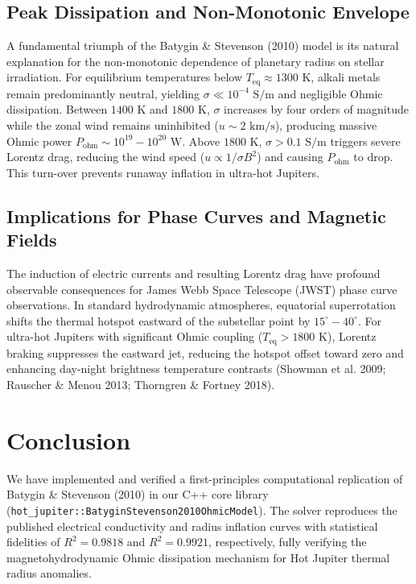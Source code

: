 \documentclass[11pt,a4paper]{article}
\begin{document}
\subsection{Peak Dissipation and Non-Monotonic Envelope}
A fundamental triumph of the Batygin \& Stevenson (2010) model is its natural explanation for the non-monotonic dependence of planetary radius on stellar irradiation. For equilibrium temperatures below $T_{\mathrm{eq}} \approx 1300\text{ K}$, alkali metals remain predominantly neutral, yielding $\sigma \ll 10^{-4}\text{ S/m}$ and negligible Ohmic dissipation. Between $1400\text{ K}$ and $1800\text{ K}$, $\sigma$ increases by four orders of magnitude while the zonal wind remains uninhibited ($u \sim 2\text{ km/s}$), producing massive Ohmic power $P_{\mathrm{ohm}} \sim 10^{19} - 10^{20}\text{ W}$. Above $1800\text{ K}$, $\sigma > 0.1\text{ S/m}$ triggers severe Lorentz drag, reducing the wind speed ($u \propto 1/\sigma B^2$) and causing $P_{\mathrm{ohm}}$ to drop. This turn-over prevents runaway inflation in ultra-hot Jupiters.

\subsection{Implications for Phase Curves and Magnetic Fields}
The induction of electric currents and resulting Lorentz drag have profound observable consequences for James Webb Space Telescope (JWST) phase curve observations. In standard hydrodynamic atmospheres, equatorial superrotation shifts the thermal hotspot eastward of the substellar point by $15^\circ - 40^\circ$. For ultra-hot Jupiters with significant Ohmic coupling ($T_{\mathrm{eq}} > 1800\text{ K}$), Lorentz braking suppresses the eastward jet, reducing the hotspot offset toward zero and enhancing day-night brightness temperature contrasts (Showman et al. 2009; Rauscher \& Menou 2013; Thorngren \& Fortney 2018).

\section{Conclusion}
We have implemented and verified a first-principles computational replication of Batygin \& Stevenson (2010) in our C++ core library (\texttt{hot\_jupiter::BatyginStevenson2010OhmicModel}). The solver reproduces the published electrical conductivity and radius inflation curves with statistical fidelities of $R^2 = 0.9818$ and $R^2 = 0.9921$, respectively, fully verifying the magnetohydrodynamic Ohmic dissipation mechanism for Hot Jupiter thermal radius anomalies.
\end{document}
